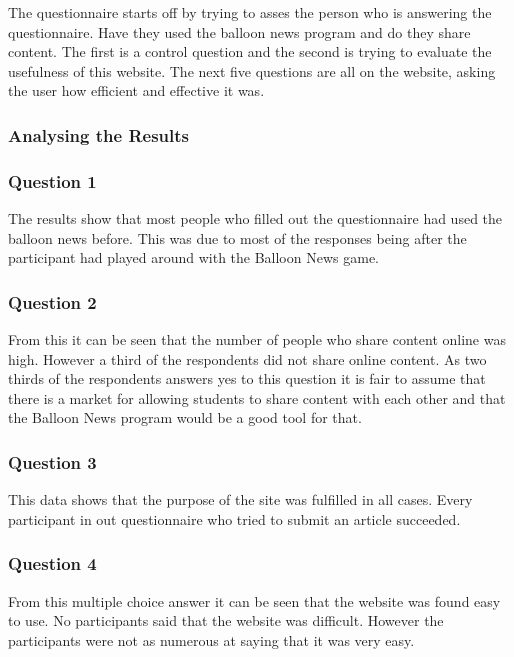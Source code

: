 The questionnaire starts off by trying to asses the person who is answering the questionnaire. Have they used the balloon news program and do they share content. The first is a control question and the second is trying to evaluate the usefulness of this website. The next five questions are all on the website, asking the user how efficient and effective it was.

\clearpage{}

\subsubsection{Analysing the Results}

\subsubsection*{Question 1}
The results show that most people who filled out the questionnaire had used the balloon news before. This was due to most of the responses being after the participant had played around with the Balloon News game.

\subsubsection*{Question 2}
From this it can be seen that the number of people who share content online was high. However a third of the respondents did not share online content. As two thirds of the respondents answers yes to this question it is fair to assume that there is a market for allowing students to share content with each other and that the Balloon News program would be a good tool for that. 

\clearpage{}
\subsubsection*{Question 3}
This data shows that the purpose of the site was fulfilled in all cases. Every participant in out questionnaire who tried to submit an article succeeded.

\subsubsection*{Question 4}
From this multiple choice answer it can be seen that the website was found easy to use. No participants said that the website was difficult. However the participants were not as numerous at saying that it was very easy. 

